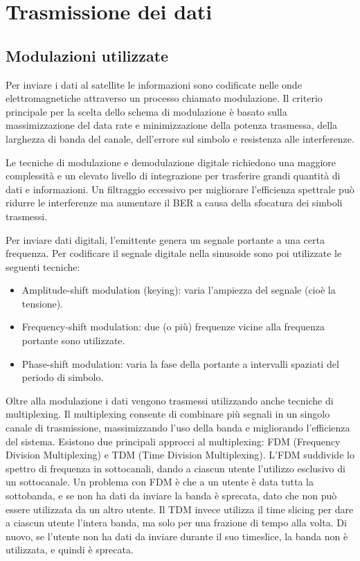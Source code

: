 
\chapter{Trasmissione dei dati}
\section{Modulazioni utilizzate}
Per inviare i dati al satellite le informazioni sono codificate nelle onde elettromagnetiche attraverso un processo chiamato modulazione.
Il criterio principale per la scelta dello schema di modulazione è basato sulla massimizzazione del data rate e minimizzazione della potenza trasmessa, della larghezza di banda del canale, dell'errore sul simbolo e resistenza alle interferenze.

Le tecniche di modulazione e demodulazione digitale richiedono una maggiore complessità e un elevato livello di integrazione per trasferire grandi quantità di dati e informazioni.
Un filtraggio eccessivo per migliorare l'efficienza spettrale può ridurre le interferenze ma aumentare il \ac{BER} a causa della sfocatura dei simboli trasmessi.

Per inviare dati digitali, l'emittente genera un segnale portante a una certa frequenza.
Per codificare il segnale digitale nella sinusoide sono poi utilizzate le seguenti tecniche:
\begin{itemize}
  \item Amplitude-shift modulation (keying): varia l'ampiezza del segnale (cioè la tensione).
  \item Frequency-shift modulation: due (o più) frequenze vicine alla frequenza portante sono utilizzate.
  \item Phase-shift modulation: varia la fase della portante a intervalli spaziati del periodo di simbolo.
\end{itemize}

Oltre alla modulazione i dati vengono trasmessi utilizzando anche tecniche di multiplexing.
Il multiplexing consente di combinare più segnali in un singolo canale di trasmissione, massimizzando l'uso della banda e migliorando l'efficienza del sistema.
Esistono due principali approcci al multiplexing: FDM (Frequency Division Multiplexing) e TDM (Time Division Multiplexing).
L'FDM suddivide lo spettro di frequenza in sottocanali, dando a ciascun utente l'utilizzo esclusivo di un sottocanale.
Un problema con FDM è che a un utente è data tutta la sottobanda, e se non ha dati da inviare la banda è sprecata, dato che non può essere utilizzata da un altro utente.
Il TDM invece utilizza il time slicing per dare a ciascun utente l'intera banda, ma solo per una frazione di tempo alla volta.
Di nuovo, se l'utente non ha dati da inviare durante il suo timeslice, la banda non è utilizzata, e quindi è sprecata.

